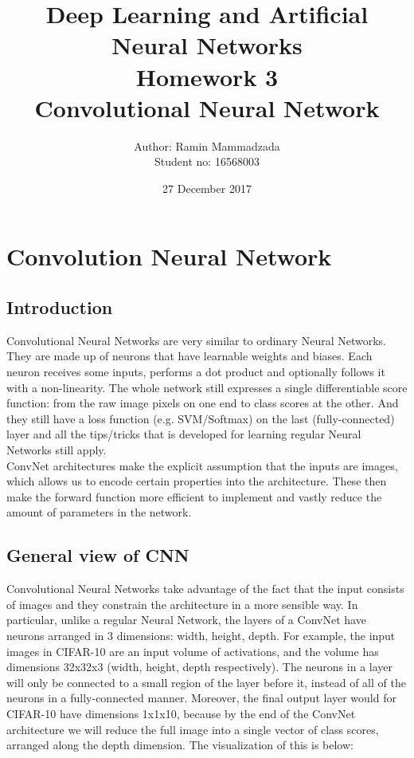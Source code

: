 \documentclass{article}
\title{Deep Learning and Artificial Neural Networks \\ Homework 3 \\ Convolutional Neural Network}
\author{Author: Ramin Mammadzada \\ Student no: 16568003}
\date{27 December 2017}
\begin{document}
\maketitle

\tableofcontents  

\newpage

\section{Convolution Neural Network}
\subsection{Introduction}
Convolutional Neural Networks are very similar to ordinary Neural Networks. They are made up of neurons that have learnable weights and biases. Each neuron receives some inputs, performs a dot product and optionally follows it with a non-linearity. The whole network still expresses a single differentiable score function: from the raw image pixels on one end to class scores at the other. And they still have a loss function (e.g. SVM/Softmax) on the last (fully-connected) layer and all the tips/tricks that is developed for learning regular Neural Networks still apply. \\
ConvNet architectures make the explicit assumption that the inputs are images, which allows us to encode certain properties into the architecture. These then make the forward function more efficient to implement and vastly reduce the amount of parameters in the network.

\subsection{General view of CNN}
Convolutional Neural Networks take advantage of the fact that the input consists of images and they constrain the architecture in a more sensible way. In particular, unlike a regular Neural Network, the layers of a ConvNet have neurons arranged in 3 dimensions: width, height, depth. For example, the input images in CIFAR-10 are an input volume of activations, and the volume has dimensions 32x32x3 (width, height, depth respectively). The neurons in a layer will only be connected to a small region of the layer before it, instead of all of the neurons in a fully-connected manner. Moreover, the final output layer would for CIFAR-10 have dimensions 1x1x10, because by the end of the ConvNet architecture we will reduce the full image into a single vector of class scores, arranged along the depth dimension. The visualization of this is below:
\end{document}
